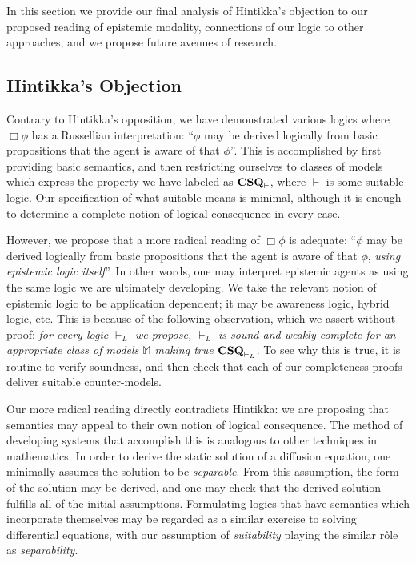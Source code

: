 In this section we provide our final analysis of Hintikka's objection
to our proposed reading of epistemic modality, connections of our
logic to other approaches, and we propose future avenues of research.

\subsection{Hintikka's Objection}\label{hintikka-conc}

Contrary to Hintikka's opposition, we have demonstrated various logics
where $\Box \phi$ has a Russellian interpretation: 
``$\phi$ may be derived logically from basic propositions that the
agent is aware of that $\phi$''.  This is accomplished
by first providing basic semantics, and then restricting ourselves to
classes of models which express the property we have labeled as 
$\textup{\textbf{CSQ}}_\vdash$, where $\vdash$ is some suitable
logic.  Our specification of what suitable means is minimal, although it
is enough to determine a complete notion of logical consequence in
every case.

However, we propose that a more radical reading of $\Box \phi$ is adequate: ``$\phi$ may be derived logically from basic propositions that the
agent is aware of that $\phi$, \emph{using epistemic logic itself}''.
In other words, one may interpret epistemic agents as using the
same logic we are ultimately developing.
We take the relevant notion of epistemic logic to be application dependent;
it may be awareness logic, hybrid logic, etc.
  This is because of the
following observation, which we assert without proof: \emph{for every
  logic $\vdash_L$ we propose, $\vdash_L$ is sound and weakly complete
  for an appropriate class of models $\mathbb{M}$ making true
  $\textup{\textbf{CSQ}}_{\vdash_L}$}.
To see why this is true, it is routine to verify soundness, and then
check that each of our completeness proofs deliver suitable counter-models.

Our more radical reading directly contradicts Hintikka: we are proposing that semantics
may appeal to their own notion of logical consequence.  The method of
developing systems that accomplish this is analogous to other
techniques in mathematics.  In
order to derive the static solution of a diffusion equation, one
 minimally assumes the solution to be \emph{separable}.  
From this assumption, the form of the solution may be derived, and one may
check that the derived solution fulfills all of the initial assumptions.  Formulating logics that have
semantics which incorporate themselves may be regarded as a similar
exercise to solving differential equations, with our assumption of
\emph{suitability} playing the similar r\^{o}le as \emph{separability}.

